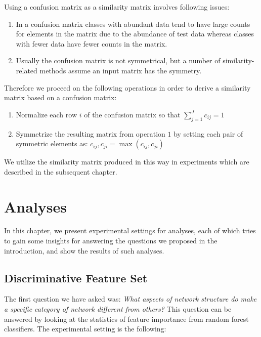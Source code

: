 \documentclass{article}
\begin{document}
Using a confusion matrix as a similarity matrix involves following issues:
\begin{enumerate}
	\item In a confusion matrix classes with abundant data tend to have large counts for elements in the matrix due to the abundance of test data whereas classes with fewer data have fewer counts in the matrix.
	\item Usually the confusion matrix is not symmetrical, but a number of similarity-related methods assume an input matrix has the symmetry.
\end{enumerate}

Therefore we proceed on the following operations in order to derive a similarity matrix based on a confusion matrix:
\begin{enumerate}
	\item Normalize each row $i$ of the confusion matrix so that $\sum_{j=1}^J c_{ij} = 1$
	\item Symmetrize the resulting matrix from operation $1$ by setting each pair of symmetric elements as: $c_{ij},c_{ji} = \max (c_{ij},c_{ji})$
\end{enumerate}

We utilize the similarity matrix produced in this way in experiments which are described in the subsequent chapter.

\newpage	
\section{Analyses}
In this chapter, we present experimental settings for analyses, each of which tries to gain some insights for answering the questions we proposed in the introduction, and show the results of such analyses.
\subsection{Discriminative Feature Set}
The first question we have asked was: \textit{What aspects of network structure do make a specific category of network different from others?} This question can be answered by looking at the statistics of feature importance from random forest classifiers. The experimental setting is the following: 
\end{document}
